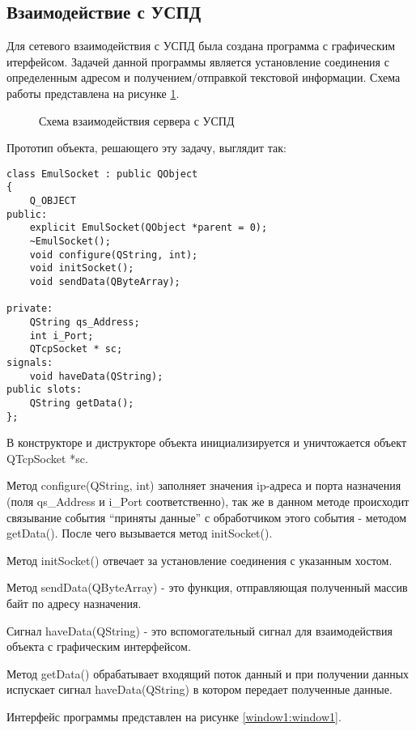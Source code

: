 \subsection{Взаимодействие с УСПД}

Для сетевого взаимодействия с УСПД была создана программа с графическим итерфейсом. Задачей данной программы является установление соединения с определенным адресом и получением/отправкой текстовой информации. Схема работы представлена на рисунке \ref{scheme1:scheme1}.

\begin{figure}[h!]
 \caption{Схема взаимодействия сервера с УСПД}
 \label{scheme1:scheme1}
\end{figure}

Прототип объекта, решающего эту задачу, выглядит так:

\begin{lstlisting}
class EmulSocket : public QObject
{
    Q_OBJECT
public:
    explicit EmulSocket(QObject *parent = 0);
    ~EmulSocket();
    void configure(QString, int);
    void initSocket();
    void sendData(QByteArray);

private:
    QString qs_Address;
    int i_Port;
    QTcpSocket * sc;
signals:
    void haveData(QString);
public slots:
    QString getData();
};
\end{lstlisting}

В конструкторе и диструкторе объекта инициализируется и уничтожается объект QTcpSocket *sc.

Метод configure(QString, int) заполняет значения ip-адреса и порта назначения (поля qs\_Address и i\_Port соответственно), так же в данном методе происходит связывание события ``приняты данные'' с обработчиком этого события - методом getData(). После чего вызывается метод initSocket().

Метод initSocket() отвечает за установление соединения с указанным хостом.

Метод sendData(QByteArray) - это функция, отправляющая полученный массив байт по адресу назначения.

Сигнал haveData(QString) - это вспомогательный сигнал для взаимодействия объекта с графическим интерфейсом.

Метод getData() обрабатывает входящий поток данный и при получении данных испускает сигнал haveData(QString) в котором передает полученные данные.

Интерфейс программы представлен на рисунке \ref{window1:window1}.

